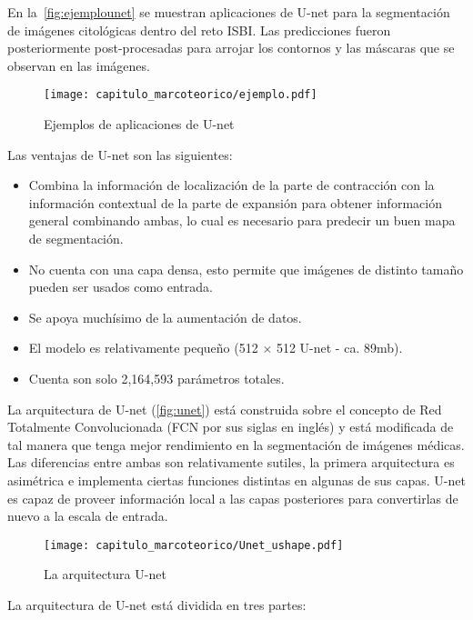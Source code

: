 En la~\autoref{fig:ejemplounet} se muestran aplicaciones de U-net para la
segmentación de imágenes citológicas dentro del reto ISBI. Las predicciones
fueron posteriormente post-procesadas para arrojar los contornos y las máscaras
que se observan en las imágenes.

\begin{figure}[H]
    \centering
    \texttt{[image: capitulo\_marcoteorico/ejemplo.pdf]}
    \caption{Ejemplos de aplicaciones de U-net}\label{fig:ejemplounet}
\end{figure}

Las ventajas de U-net son las siguientes:

\begin{itemize}
    \item Combina la información de localización de la parte de contracción con la
    información contextual de la parte de expansión para obtener información
    general combinando ambas, lo cual es necesario para predecir un buen mapa
    de segmentación.
    \item No cuenta con una capa densa, esto permite que imágenes de distinto
    tamaño pueden ser usados como entrada.
    \item Se apoya muchísimo de la aumentación de datos.
    \item El modelo es relativamente pequeño (512 $\times$ 512 U-net - ca. 89mb).
    \item Cuenta son solo 2,164,593 parámetros totales.
\end{itemize}

La arquitectura de U-net (\autoref{fig:unet}) está construida sobre el concepto de 
Red Totalmente Convolucionada (FCN por sus siglas en inglés) y está modificada
de tal manera que tenga mejor rendimiento en la segmentación de imágenes médicas. 
Las diferencias entre ambas son relativamente sutiles, la primera arquitectura es
asimétrica e implementa ciertas funciones distintas en algunas de sus capas. U-net
es capaz de proveer información local a las capas posteriores para convertirlas
de nuevo a la escala de entrada.~\cite{DeepLearning}

\begin{figure}[H]
    \centering
    \texttt{[image: capitulo\_marcoteorico/Unet\_ushape.pdf]}
    \caption{La arquitectura U-net}\label{fig:unet}
\end{figure}

La arquitectura de U-net está dividida en tres partes:

